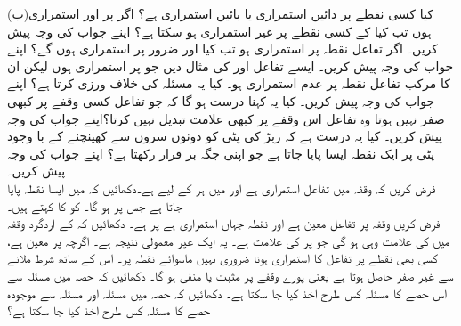(ب)\quad  کیا کسی نقطے پر  دائیں استمراری یا بائیں استمراری ہے؟
اگر  پر  اور  استمراری ہوں تب کیا  کے کسی نقطے پر  غیر استمراری ہو سکتا ہے؟ اپنے جواب کی وجہ پیش کریں۔
اگر تفاعل  نقطہ  پر استمراری ہو تب کیا  اور  ضرور  پر استمراری ہوں گے؟ اپنے جواب کی وجہ پیش کریں۔
ایسے تفاعل  اور  کی مثال دیں جو  پر استمراری ہوں لیکن ان کا مرکب تفاعل  نقطہ  پر عدم استمراری ہو۔ کیا یہ مسئلہ  کی خلاف ورزی کرتا ہے؟ اپنے جواب کی وجہ پیش کریں۔
کیا یہ کہنا درست ہو گا کہ جو تفاعل کسی وقفے پر کبھی صفر نہیں ہوتا   وہ تفاعل اس وقفے پر کبھی علامت تبدیل نہیں کرتا؟اپنے جواب کی وجہ پیش کریں۔
کیا یہ درست ہے کہ ربڑ کی پٹی کو دونوں سروں سے کھینچنے کے با وجود پٹی پر ایک نقطہ ایسا پایا جاتا ہے جو اپنی جگہ بر قرار رکھتا ہے؟ اپنے جواب کی وجہ پیش کریں۔
\\
فرض کریں کہ وقفہ  میں تفاعل  استمراری ہے اور  میں ہر  کے لیے  ہے۔دکھائیں کہ  میں ایسا نقطہ  پایا جاتا ہے جس پر  ہو گا۔  کو  کا  کہتے ہیں۔
\\
فرض کریں  وقفہ  پر تفاعل  معین ہے اور نقطہ  جہاں  استمراری ہے پر   ہے۔ دکھائیں کہ   کے اردگرد وقفہ  میں  کی علامت وہی ہو گی جو  پر  کی علامت  ہے۔ یہ ایک غیر معمولی نتیجہ ہے۔ اگرچہ  پر  معین ہے، کسی بھی نقطے پر تفاعل کا استمراری ہونا ضروری نہیں   ماسوائے نقطہ  پر۔ اس کے ساتھ شرط  ملانے سے  غیر صفر حاصل ہوتا ہے یعنی پورے وقفے پر  مثبت یا منفی ہو گا۔
دکھائیں کہ حصہ  میں مسئلہ  سے اس حصے کا مسئلہ  کس طرح اخذ کیا جا سکتا ہے۔ 
دکھائیں کہ حصہ  میں مسئلہ  اور مسئلہ  سے موجودہ حصے کا مسئلہ  کس طرح اخذ کیا جا سکتا ہے؟


